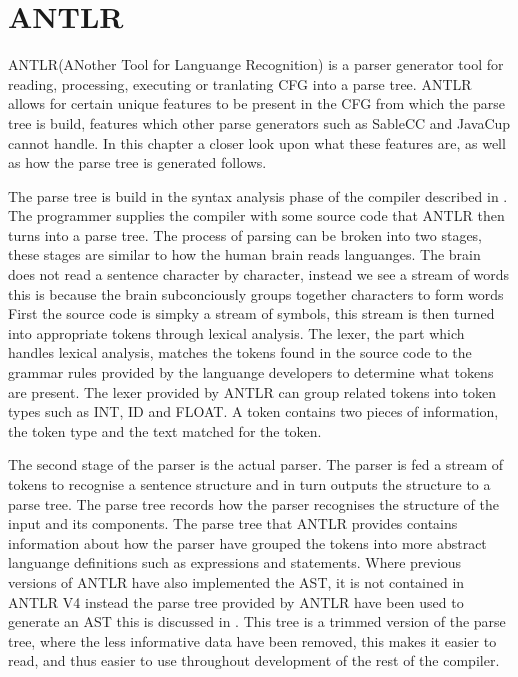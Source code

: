 \section{ANTLR}
ANTLR(ANother Tool for Languange Recognition) is a parser generator tool for reading, processing, executing or tranlating CFG into a parse tree.
ANTLR allows for certain unique features to be present in the CFG from which the parse tree is build, features which other parse generators such as SableCC and JavaCup cannot handle. 
In this chapter a closer look upon what these features are, as well as how the parse tree is generated follows.

The parse tree is build in the syntax analysis phase of the compiler described in .
The programmer supplies the compiler with some source code that ANTLR then turns into a parse tree.
The process of parsing can be broken into two stages, these stages are similar to how the human brain reads languanges.
The brain does not read a sentence character by character, instead we see a stream of words this is because the brain subconciously groups together characters to form words
First the source code is simpky a stream of symbols, this stream is then turned into appropriate tokens through lexical analysis.
The lexer, the part which handles lexical analysis, matches the tokens found in the source code to the grammar rules provided by the languange developers to determine what tokens are present.
The lexer provided by ANTLR can group related tokens into token types such as INT, ID and FLOAT.
A token contains two pieces of information, the token type and the text matched for the token. 

The second stage of the parser is the actual parser.
The parser is fed a stream of tokens to recognise a sentence structure and in turn outputs the structure to a parse tree.
The parse tree records how the parser recognises the structure of the input and its components.
The parse tree that ANTLR provides contains information about how the parser have grouped the tokens into more abstract languange definitions such as expressions and statements.
Where previous versions of ANTLR have also implemented the AST, it is not contained in ANTLR V4 instead the parse tree provided by ANTLR have been used to generate an AST this is discussed in .
This tree is a trimmed version of the parse tree, where the less informative data have been removed, this makes it easier to read, and thus easier to use throughout development of the rest of the compiler.

